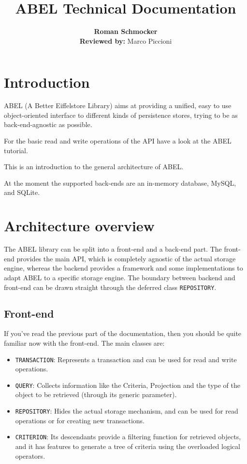 \documentclass[a4paper,12pt]{report}
\title {ABEL Technical Documentation}
\author {
	\textbf{Roman Schmocker} \\
	\textbf{Reviewed by:} Marco Piccioni
}
\begin{document}
\maketitle


%


\tableofcontents



\chapter{Introduction}
ABEL (A Better Eiffelstore Library) aims at providing a unified, easy to use object-oriented interface to different kinds of persistence stores, trying to be as back-end-agnostic as possible.

For the basic read and write operations of the API have a look at the ABEL tutorial. 

This is an introduction to the general architecture of ABEL.

At the moment the supported back-ends are an in-memory database, MySQL, and SQLite. 
 
\chapter{Architecture overview}

The ABEL library can be split into a front-end and a back-end part.
The front-end provides the main API, which is completely agnostic of the actual storage engine, 
whereas the backend provides a framework and some implementations to adapt ABEL to a specific storage engine.
The boundary between backend and front-end can be drawn straight through the deferred class \lstinline!REPOSITORY!.

\section{Front-end}

If you've read the previous part of the documentation, then you should be quite familiar now with the front-end.
The main classes are:
 \begin{itemize}
  \item \lstinline!TRANSACTION!: Represents a transaction and can be used for read and write operations.
  \item \lstinline!QUERY!: Collects information like the Criteria, Projection and the type of the object to be retrieved (through its generic parameter).
  \item \lstinline!REPOSITORY!: Hides the actual storage mechanism, and can be used for read operations or for creating new transactions.
  \item \lstinline!CRITERION!: Its descendants provide a filtering function for retrieved objects, and it has features to generate a tree of criteria using the overloaded logical operators.
 \end{itemize}
\end{document}
